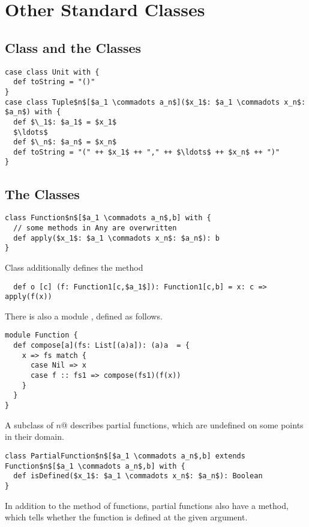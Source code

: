 \documentclass[a4paper,12pt,twoside,titlepage]{book}
\begin{document}
\section{Other Standard Classes}

\subsection{Class  and the  Classes}
\label{sec:cls-tuple}

\begin{lstlisting}
case class Unit with {
  def toString = "()"
}
case class Tuple$n$[$a_1 \commadots a_n$]($x_1$: $a_1 \commadots x_n$: $a_n$) with {
  def $\_1$: $a_1$ = $x_1$
  $\ldots$
  def $\_n$: $a_n$ = $x_n$
  def toString = "(" ++ $x_1$ ++ "," ++ $\ldots$ ++ $x_n$ ++ ")"
}
\end{lstlisting}

\subsection{The  Classes}
\label{sec:cls-function}

\begin{lstlisting}
class Function$n$[$a_1 \commadots a_n$,b] with {
  // some methods in Any are overwritten
  def apply($x_1$: $a_1 \commadots x_n$: $a_n$): b
}
\end{lstlisting}
Class  additionally defines the method
\begin{lstlisting}
  def o [c] (f: Function1[c,$a_1$]): Function1[c,b] = x: c => apply(f(x))
\end{lstlisting}
There is also a module , defined as follows.
\begin{lstlisting}
module Function {
  def compose[a](fs: List[(a)a]): (a)a  = {
    x => fs match {
      case Nil => x
      case f :: fs1 => compose(fs1)(f(x))
    }
  }
}
\end{lstlisting}
A subclass of \lstinline@Function$n$@ describes partial functions, which
are undefined on some points in their domain.

\begin{lstlisting}
class PartialFunction$n$[$a_1 \commadots a_n$,b] extends Function$n$[$a_1 \commadots a_n$,b] with {
  def isDefined($x_1$: $a_1 \commadots x_n$: $a_n$): Boolean
}
\end{lstlisting}

In addition to the  method of functions, partial functions
also have a  method, which tells whether the function
is defined at the given argument.
\end{document}

